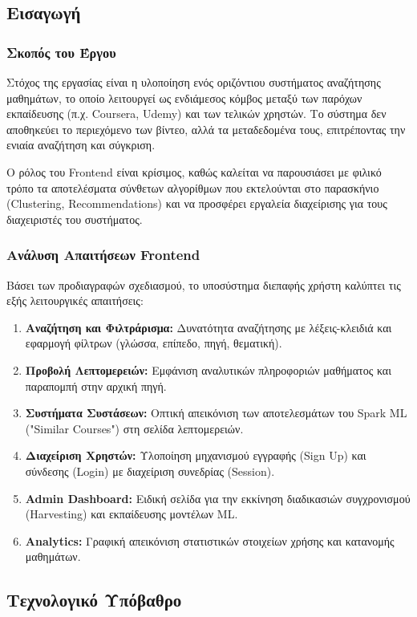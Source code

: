 \documentclass[a4paper,12pt]{article}
\begin{document}
\subsection{Εισαγωγή}

\subsubsection{Σκοπός του Έργου} 
Στόχος της εργασίας είναι η υλοποίηση ενός οριζόντιου συστήματος αναζήτησης μαθημάτων, το οποίο λειτουργεί ως ενδιάμεσος κόμβος μεταξύ των παρόχων εκπαίδευσης (π.χ. Coursera, Udemy) και των τελικών χρηστών. Το σύστημα δεν αποθηκεύει το περιεχόμενο των βίντεο, αλλά τα μεταδεδομένα τους, επιτρέποντας την ενιαία αναζήτηση και σύγκριση.

Ο ρόλος του Frontend είναι κρίσιμος, καθώς καλείται να παρουσιάσει με φιλικό τρόπο τα αποτελέσματα σύνθετων αλγορίθμων που εκτελούνται στο παρασκήνιο (Clustering, Recommendations) και να προσφέρει εργαλεία διαχείρισης για τους διαχειριστές του συστήματος.

\subsubsection{Ανάλυση Απαιτήσεων Frontend}
Βάσει των προδιαγραφών σχεδιασμού, το υποσύστημα διεπαφής χρήστη καλύπτει τις εξής λειτουργικές απαιτήσεις:
\begin{enumerate}
    \item \textbf{Αναζήτηση και Φιλτράρισμα:} Δυνατότητα αναζήτησης με λέξεις-κλειδιά και εφαρμογή φίλτρων (γλώσσα, επίπεδο, πηγή, θεματική).
    \item \textbf{Προβολή Λεπτομερειών:} Εμφάνιση αναλυτικών πληροφοριών μαθήματος και παραπομπή στην αρχική πηγή.
    \item \textbf{Συστήματα Συστάσεων:} Οπτική απεικόνιση των αποτελεσμάτων του Spark ML ("Similar Courses") στη σελίδα λεπτομερειών.
    \item \textbf{Διαχείριση Χρηστών:} Υλοποίηση μηχανισμού εγγραφής (Sign Up) και σύνδεσης (Login) με διαχείριση συνεδρίας (Session).
    \item \textbf{Admin Dashboard:} Ειδική σελίδα για την εκκίνηση διαδικασιών συγχρονισμού (Harvesting) και εκπαίδευσης μοντέλων ML.
    \item \textbf{Analytics:} Γραφική απεικόνιση στατιστικών στοιχείων χρήσης και κατανομής μαθημάτων.
\end{enumerate}

\subsection{Τεχνολογικό Υπόβαθρο}
\end{document}
